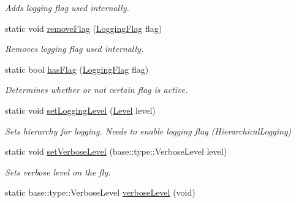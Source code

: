 \begin{DoxyCompactItemize}
\begin{DoxyCompactList}\small\item\em Adds logging flag used internally. \end{DoxyCompactList}\item 
\hypertarget{classel_1_1Loggers_a23fcb4b492f70a34285c45c0b5e2e515}{static void \hyperlink{classel_1_1Loggers_a23fcb4b492f70a34285c45c0b5e2e515}{remove\-Flag} (\hyperlink{namespaceel_a2784aacd04cb7816ac1c0b20fcbf83cb}{Logging\-Flag} flag)}\label{classel_1_1Loggers_a23fcb4b492f70a34285c45c0b5e2e515}

\begin{DoxyCompactList}\small\item\em Removes logging flag used internally. \end{DoxyCompactList}\item 
\hypertarget{classel_1_1Loggers_a591a45565c1eb7073ec3a979df8b5a4c}{static bool \hyperlink{classel_1_1Loggers_a591a45565c1eb7073ec3a979df8b5a4c}{has\-Flag} (\hyperlink{namespaceel_a2784aacd04cb7816ac1c0b20fcbf83cb}{Logging\-Flag} flag)}\label{classel_1_1Loggers_a591a45565c1eb7073ec3a979df8b5a4c}

\begin{DoxyCompactList}\small\item\em Determines whether or not certain flag is active. \end{DoxyCompactList}\item 
\hypertarget{classel_1_1Loggers_afbee019d722fef5148d8355f45ba7993}{static void \hyperlink{classel_1_1Loggers_afbee019d722fef5148d8355f45ba7993}{set\-Logging\-Level} (\hyperlink{namespaceel_ab0ac6091262344c52dd2d3ad099e8e36}{Level} level)}\label{classel_1_1Loggers_afbee019d722fef5148d8355f45ba7993}

\begin{DoxyCompactList}\small\item\em Sets hierarchy for logging. Needs to enable logging flag (Hierarchical\-Logging) \end{DoxyCompactList}\item 
\hypertarget{classel_1_1Loggers_a826b238fe4f3719305a2d19f0c121fa0}{static void \hyperlink{classel_1_1Loggers_a826b238fe4f3719305a2d19f0c121fa0}{set\-Verbose\-Level} (base\-::type\-::\-Verbose\-Level level)}\label{classel_1_1Loggers_a826b238fe4f3719305a2d19f0c121fa0}

\begin{DoxyCompactList}\small\item\em Sets verbose level on the fly. \end{DoxyCompactList}\item 
\hypertarget{classel_1_1Loggers_ad4840bb4b6b80746a2212cf3cc058142}{static base\-::type\-::\-Verbose\-Level \hyperlink{classel_1_1Loggers_ad4840bb4b6b80746a2212cf3cc058142}{verbose\-Level} (void)}\label{classel_1_1Loggers_ad4840bb4b6b80746a2212cf3cc058142}


\end{DoxyCompactItemize}
